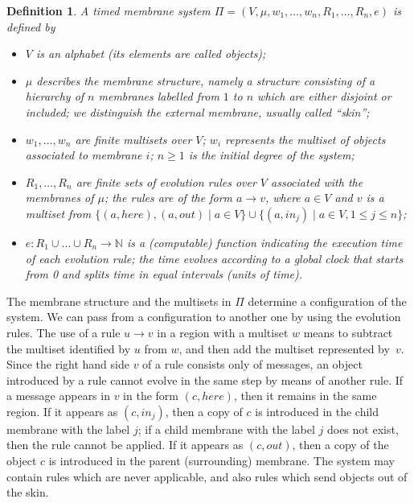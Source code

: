 \documentclass{eptcs}
\newtheorem{definition}{Definition}
\begin{document}
\begin{definition}
\label{definition:timed_symanti} A {\rm timed membrane system}
$\Pi=(V,\mu,w_1,\ldots,w_n,R_1,\ldots,R_n,e)$ is defined by
\begin{itemize}
\item[$\bullet$] $V$ is an alphabet (its elements are called
{\rm objects});

\item[$\bullet$] $\mu$ describes the {\rm membrane
structure}, namely a structure consisting of a hierarchy of $n$
membranes labelled from $1$ to $n$ which are either disjoint or
included; we distinguish the external membrane, usually called
``skin'';

\item[$\bullet$] $w_1,\ldots,w_n$ are finite multisets over $V$; $w_i$
represents the multiset of objects associated to membrane $i$; $n
\geq 1$ is the initial degree of the system;

\item[$\bullet$] $R_1,\ldots,R_n$ are finite sets of
evolution rules over $V$ associated with the membranes of $\mu$; the
rules are of the form $a \rightarrow v$, where $a \in V$ and $v$ is
a multiset from $\{(a,here),(a,out)\mid a\in V\} \cup \{(a,in_j)
\mid a\in V, 1 \leq j \leq n\}$;

\item $e: R_1 \cup \ldots \cup R_n \rightarrow \mathds{N}$ is a
(computable) function indicating the execution time of each
evolution rule; the time evolves according to a global clock that
starts from 0 and splits time in equal intervals (units of time).
\end{itemize}
\end{definition}

The membrane structure and the multisets in $\Pi$ determine a
configuration of the system. We can pass from a configuration to
another one by using the evolution rules. The use of a rule
$u\rightarrow v$ in a region with a multiset $w$ means to subtract
the multiset identified by $u$ from $w$, and then add the multiset
represented by~$v$.
Since the right hand side $v$ of a rule consists only of messages,
an object introduced by a rule cannot evolve in the same step by
means of another rule. If a message appears in $v$ in the form
$(c,here)$, then it remains in the same region. If it appears as
$(c,in_j)$, then a copy of $c$ is introduced in the child membrane
with the label $j$; if a child membrane with the label $j$ does not
exist, then the rule cannot be applied. If it appears as $(c,out)$,
then a copy of the object $c$ is introduced in the parent (surrounding)
membrane. The system may contain rules which are never applicable,
and also rules which send objects out of the skin.
\end{document}
